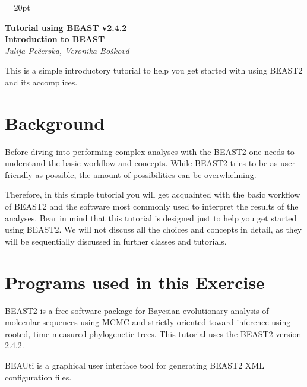 \documentclass[11pt]{article}
\begin{document}
\renewcommand{\headrulewidth}{0.5pt}
\headsep = 20pt
\lhead{ }

\thispagestyle{plain}

\begin{center}
\textbf{\LARGE Tutorial using BEAST v2.4.2}\\\vspace{2mm}
\textbf{\textcolor{mycol}{\Large Introduction to BEAST}}\\
\vspace{4mm}
{\Large {\em J\={u}lija Pe\v{c}erska, Veronika Bo\v{s}kov\'{a}}}
\end{center}

This is a simple introductory tutorial to help you get started with using BEAST2 and its accomplices.

\bigskip
\section{Background}

Before diving into performing complex analyses with the BEAST2 one needs to understand the basic workflow and concepts. While BEAST2 tries to be as user-friendly as possible, the amount of possibilities can be overwhelming.

Therefore, in this simple tutorial you will get acquainted with the basic workflow of BEAST2 and the software most commonly used to interpret the results of the analyses. Bear in mind that this tutorial is designed just to help you get started using BEAST2. We will not discuss all the choices and concepts in detail, as they will be sequentially discussed in further classes and tutorials.

\clearpage
\newpage
\section{Programs used in this Exercise}\label{programsSec}


BEAST2 is a free software package for Bayesian evolutionary analysis of molecular sequences using MCMC and strictly oriented toward inference using rooted, time-measured phylogenetic trees. This tutorial uses the BEAST2 version 2.4.2.


BEAUti is a graphical user interface tool for generating BEAST2 XML configuration files.
\end{document}
